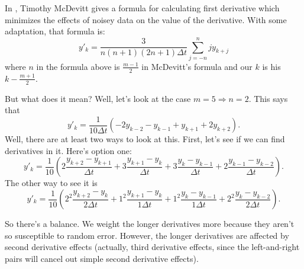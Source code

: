 \documentclass{amsart}
\begin{document}
In \cite {McDevittSlides}, Timothy McDevitt gives a formula for calculating
first derivative which minimizes the effects of noisey data on the value of
the derivative.  With some adaptation, that formula is:
$$y'_k = \frac{3}{n(n+1)(2n+1) \Delta t} \sum_{j=-n}^n j y_{k+j}$$
where $n$ in the formula above is $\frac{m-1}{2}$ in McDevitt's formula and
our $k$ is his $k - \frac{m+1}{2}$.

But what does it mean?  Well, let's look at the case $m=5 \Rightarrow n = 2$.
This says that
$$y'_k = \frac{1}{10 \Delta t} \left( -2 y_{k-2} - y_{k-1} + y_{k+1} + 2
  y_{k+2} \right).$$
Well, there are at least two ways to look at this.  First, let's see if we can
find derivatives in it.  Here's option one:
$$y'_k = \frac{1}{10} \left( 2 \frac{y_{k+2} - y_{k+1}}{\Delta t} 
  + 3 \frac{y_{k+1} - y_k}{\Delta t} + 3 \frac{y_k - y_{k-1}}{\Delta t}
  + 2 \frac{y_{k-1} - y_{k-2}}{\Delta t} \right).$$
The other way to see it is
$$y'_k = \frac{1}{10} \left( 2^2 \frac{y_{k+2} - y_k}{2 \Delta t}
  + 1^2 \frac{y_{k+1} - y_k}{1 \Delta t} 
  + 1^2 \frac{y_k - y_{k-1}}{1 \Delta t}
  + 2^2 \frac{y_k - y_{k-2}}{2 \Delta t} \right).$$

So there's a balance.  We weight the longer derivatives more because they
aren't so susceptible to random error.  However, the longer derivatives are
affected by second derivative effects (actually, third derivative effects, 
since the left-and-right pairs will cancel out simple second derivative
effects).
\end{document}
